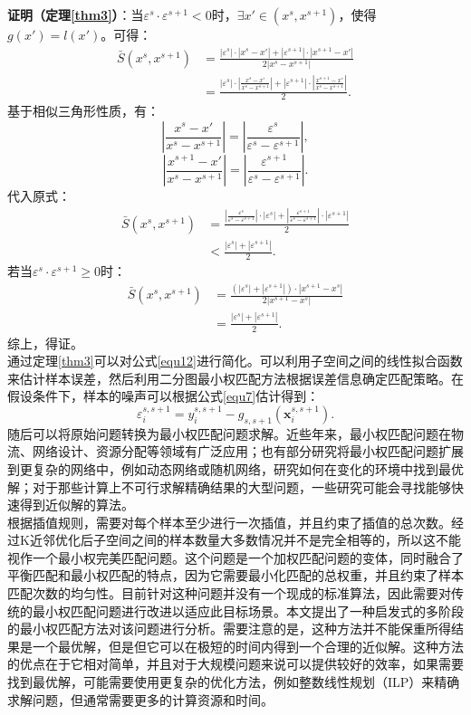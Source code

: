 \documentclass{NauThesis}
\begin{document}
\noindent \textbf{证明（定理\ref{thm3}）}：当$\varepsilon^s\cdot\varepsilon^{s+1}<0$时，$\exists x'\in(x^s,x^{s+1})$，使得
$g(x')=l(x')$。可得：
$$\begin{aligned}
    \bar{
    S}(x^s,x^{s+1})&=\frac{|\varepsilon^{s}|\cdot|x^{s}-x'|+|\varepsilon^{s+1}|\cdot|x^{s+1}-x'|}{2|x^s-x^{s+1}|}\\
    &=\frac{|\varepsilon^{s}|\cdot|\frac{x^s-x'}{x^{s}-x^{s+1}}|+|\varepsilon^{s+1}|\cdot|\frac{x^{s+1}-x'}{x^{s}-x^{s+1}}|}{2}.
    \end{aligned}$$
基于相似三角形性质，有：
$$|\frac{x^s-x'}{x^{s}-x^{s+1}}|=|\frac{\varepsilon^s}{\varepsilon^s-\varepsilon^{s+1}}|,$$
$$|\frac{x^{s+1}-x'}{x^{s}-x^{s+1}}|=|\frac{\varepsilon^{s+1}}{\varepsilon^s-\varepsilon^{s+1}}|.$$
代入原式：
$$\begin{aligned}
    \bar{
    S}(x^s,x^{s+1})&=
    \frac{|\frac{\varepsilon^s}{\varepsilon^s-\varepsilon^{s+1}}|\cdot |\varepsilon^{s}|+|\frac{\varepsilon^{s+1}}{\varepsilon^s-\varepsilon^{s+1}}|\cdot|\varepsilon^{s+1}|}{2}\\&<
    \frac{|\varepsilon^s|+|\varepsilon^{s+1}|}{2}.
    \end{aligned}$$
若当$\varepsilon^s\cdot\varepsilon^{s+1}\ge0$时：
$$\begin{aligned}
    \bar{
    S}(x^s,x^{s+1})&=\frac{(|\varepsilon^s|+|\varepsilon^{s+1}|)\cdot|x^{s+1}-x^{s}|}{2|x^{s+1}-x^{s}|}\\&=
    \frac{|\varepsilon^s|+|\varepsilon^{s+1}|}{2}.
    \end{aligned}$$
综上，得证。
\\\hspace*{2em}通过定理\ref{thm3}可以对公式\eqref{equ12}进行简化。可以利用子空间之间的线性拟合函数来估计样本误差，然后利用二分图最小权匹配方法根据误差信息确定匹配策略。在假设条件下，样本的噪声可以根据公式\eqref{equ7}估计得到：
\begin{equation}\label{equ15}
    \varepsilon_i^{s,s+1}=y_i^{s,s+1}-g_{s,s+1}(\boldsymbol{x}_i^{s,s+1}).    
\end{equation}
\hspace*{2em}随后可以将原始问题转换为最小权匹配问题求解。近些年来，最小权匹配问题在物流、网络设计、资源分配等领域有广泛应用\cite{ref73,ref74,ref75}；也有部分研究将最小权匹配问题扩展到更复杂的网络中，例如动态网络或随机网络，研究如何在变化的环境中找到最优解\cite{ref76,ref77,ref78}；对于那些计算上不可行求解精确结果的大型问题，一些研究可能会寻找能够快速得到近似解的算法\cite{ref79,ref80}。
\\\hspace*{2em}根据插值规则，需要对每个样本至少进行一次插值，并且约束了插值的总次数。经过K近邻优化后子空间之间的样本数量大多数情况并不是完全相等的，所以这不能视作一个最小权完美匹配问题。这个问题是一个加权匹配问题的变体，同时融合了平衡匹配和最小权匹配的特点，因为它需要最小化匹配的总权重，并且约束了样本匹配次数的均匀性。目前针对这种问题并没有一个现成的标准算法，因此需要对传统的最小权匹配问题进行改进以适应此目标场景。本文提出了一种启发式的多阶段的最小权匹配方法对该问题进行分析。需要注意的是，这种方法并不能保重所得结果是一个最优解，但是但它可以在极短的时间内得到一个合理的近似解。这种方法的优点在于它相对简单，并且对于大规模问题来说可以提供较好的效率，如果需要找到最优解，可能需要使用更复杂的优化方法，例如整数线性规划（ILP）来精确求解问题，但通常需要更多的计算资源和时间。
\end{document}
